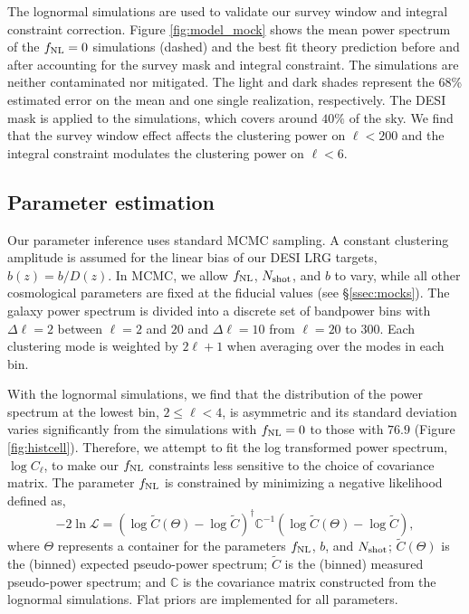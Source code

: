 The lognormal simulations are used to validate our survey window and integral constraint correction. Figure \ref{fig:model_mock} shows the mean power spectrum of the $f_{\rm NL}=0$ simulations (dashed) and the best fit theory prediction before and after accounting for the survey mask and integral constraint. The simulations are neither contaminated nor mitigated. The light and dark shades represent the 68\% estimated error on the mean and one single realization, respectively. The DESI mask is applied to the simulations, which covers around $40\%$ of the sky. We find that the survey window effect affects the clustering power on $\ell < 200$ and the integral constraint modulates the clustering power on $\ell < 6$.

\subsection{Parameter estimation}
Our parameter inference uses standard MCMC sampling. A constant clustering amplitude is assumed for the linear bias of our DESI LRG targets, $b(z) = b/D(z)$. In MCMC, we allow $f_{\rm NL}$, $N_{\rm shot}$, and $b$ to vary, while all other cosmological parameters are fixed at the fiducial values (see \S \ref{ssec:mocks}). The galaxy power spectrum is divided into a discrete set of bandpower bins with $\Delta\ell=2$ between $\ell=2$ and $20$ and $\Delta \ell=10$ from $\ell=20$ to $300$. Each clustering mode is weighted by $2\ell+1$ when averaging over the modes in each bin.

With the lognormal simulations, we find that the distribution of the power spectrum at the lowest bin, $2\leq \ell < 4$, is asymmetric and its standard deviation varies significantly from the simulations with $f_{\rm NL}=0$ to those with $76.9$ (Figure \ref{fig:histcell}). Therefore, we attempt to fit the log transformed power spectrum, $\log C_{\ell}$, to make our $f_{\rm NL}$ constraints less sensitive to the choice of covariance matrix. The parameter $f_{\rm NL}$ is constrained by minimizing a negative likelihood defined as,
\begin{equation}
-2\ln\mathcal{L} = (\log \tilde{C}(\Theta)-\log \tilde{C})^{\dagger} \mathbb{C}^{-1} (\log \tilde{C}(\Theta)-\log \tilde{C}),
\end{equation}
where $\Theta$ represents a container for the parameters $f_{\rm NL}$, $b$, and $N_{\rm shot}$; $\tilde{C}(\Theta)$ is the (binned) expected pseudo-power spectrum; $\tilde{C}$ is the (binned) measured pseudo-power spectrum; and $\mathbb{C}$ is the covariance matrix constructed from the lognormal simulations. Flat priors are implemented for all parameters.

